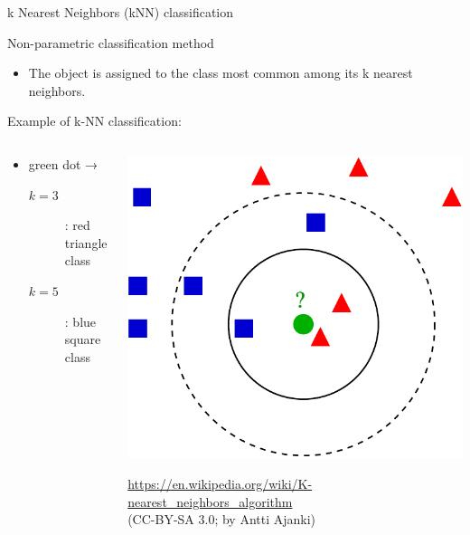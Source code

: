 \documentclass[unicode, 12pt, xdvipdfmx, aspectratio=169]{beamer}
\begin{document}
\begin{frame}[label={sec:org1151eaf}]{k Nearest Neighbors (kNN) classification}
\begin{block}{Non-parametric classification method}
\begin{itemize}
\item The object is assigned to the class most common among its k nearest neighbors.
\end{itemize}
\end{block}

\begin{block}{Example of k-NN classification:}
\begin{columns}
\begin{column}{0.4\columnwidth}
\vspace{-0.3cm}
\begin{itemize}
\item green dot →
\begin{description}
\item[{\(k = 3\)}] : red triangle class
\item[{\(k = 5\)}] : blue square class
\end{description}
\end{itemize}
\end{column}

\begin{column}{0.3\columnwidth}
\vspace{-0.3cm}
\begin{center}
\includegraphics[width=0.7\linewidth]{./figure/KnnClassification.pdf}
\end{center}
\tiny \vspace{-0.3cm}
\url{https://en.wikipedia.org/wiki/K-nearest\_neighbors\_algorithm} \\ (CC-BY-SA 3.0; by Antti Ajanki)
\end{column}
\end{columns}
\end{block}
\end{frame}
\end{document}
